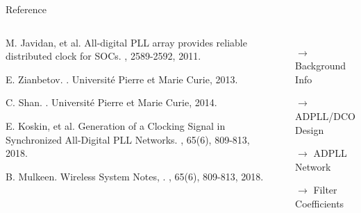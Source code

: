 \documentclass{beamer}
\begin{document}
\begin{frame}{Reference}
	\begin{columns}
		\begin{thebibliography}{10}
		\begin{tiny}
		M. Javidan, et al.
		\newblock All-digital PLL array provides reliable distributed clock for SOCs.
		, 2589-2592, 2011. %
  	
	    E. Zianbetov.
	    .
		\newblock Universit\'e Pierre et Marie Curie, 2013. %
		
		C. Shan.
		.
		\newblock Universit\'e Pierre et Marie Curie, 2014. %
		
	    E. Koskin, et al.
	    \newblock Generation of a Clocking Signal in Synchronized All-Digital PLL Networks.
	    , 65(6), 809-813, 2018. %

	    B. Mulkeen.
	    \newblock Wireless System Notes, .
	    , 65(6), 809-813, 2018. %
	    
	    \end{tiny}
	  	\end{thebibliography}
  		\begin{itemize}
  			\item[$\rightarrow$] Background Info
  			\vspace{0.6 cm}
  			\item[$\rightarrow$] ADPLL/DCO Design
  			\vspace{0.6 cm}
  			\item[$\rightarrow$] ADPLL Network
  			\vspace{0.6 cm}
  			\item[$\rightarrow$] Filter Coefficients
  		\end{itemize}
  \end{columns}
\end{frame}
\end{document}
